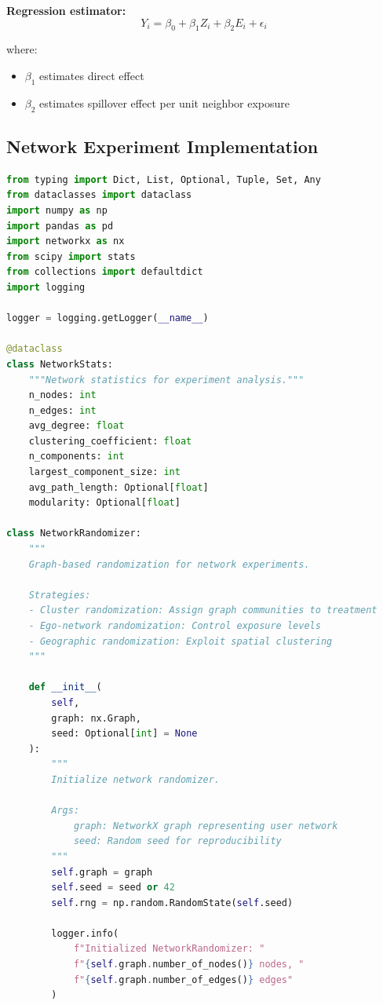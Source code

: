 \textbf{Regression estimator:}
\begin{equation}
Y_i = \beta_0 + \beta_1 Z_i + \beta_2 E_i + \epsilon_i
\end{equation}

where:
\begin{itemize}
    \item $\beta_1$ estimates direct effect
    \item $\beta_2$ estimates spillover effect per unit neighbor exposure
\end{itemize}

\subsection{Network Experiment Implementation}

\begin{lstlisting}[language=Python, caption={Network Experiment Framework}]
from typing import Dict, List, Optional, Tuple, Set, Any
from dataclasses import dataclass
import numpy as np
import pandas as pd
import networkx as nx
from scipy import stats
from collections import defaultdict
import logging

logger = logging.getLogger(__name__)

@dataclass
class NetworkStats:
    """Network statistics for experiment analysis."""
    n_nodes: int
    n_edges: int
    avg_degree: float
    clustering_coefficient: float
    n_components: int
    largest_component_size: int
    avg_path_length: Optional[float]
    modularity: Optional[float]

class NetworkRandomizer:
    """
    Graph-based randomization for network experiments.

    Strategies:
    - Cluster randomization: Assign graph communities to treatment
    - Ego-network randomization: Control exposure levels
    - Geographic randomization: Exploit spatial clustering
    """

    def __init__(
        self,
        graph: nx.Graph,
        seed: Optional[int] = None
    ):
        """
        Initialize network randomizer.

        Args:
            graph: NetworkX graph representing user network
            seed: Random seed for reproducibility
        """
        self.graph = graph
        self.seed = seed or 42
        self.rng = np.random.RandomState(self.seed)

        logger.info(
            f"Initialized NetworkRandomizer: "
            f"{self.graph.number_of_nodes()} nodes, "
            f"{self.graph.number_of_edges()} edges"
        )


\end{lstlisting}
